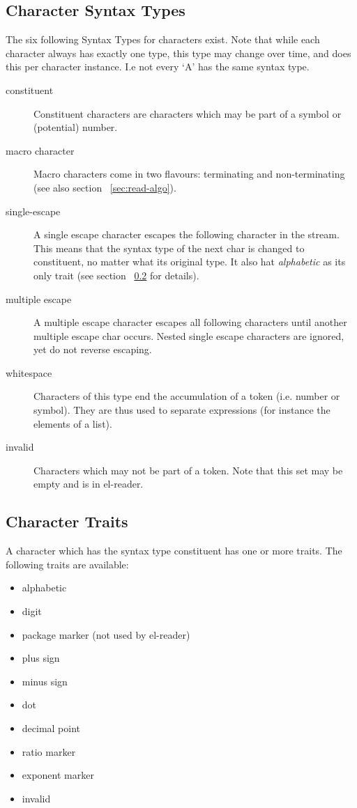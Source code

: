 \documentclass[a4paper,10pt,twoside]{report}
\newcommand{\elr}{el-reader}
\begin{document}
\subsection{Character Syntax Types}
\label{subsubsec:syntax-type}

The six following Syntax Types for characters exist.  Note that while each
character always has exactly one type, this type may change over time, and does
this per character instance.  I.e not every `A' has the same syntax type.

\begin{description}
\item[constituent] Constituent characters are characters which may be part of a
  symbol or (potential) number.
\item[macro character] Macro characters come in two flavours: terminating and
  non-terminating (see also section ~\ref{sec:read-algo}).
\item[single-escape] A single escape character escapes the following character
  in the stream.  This means that the syntax type of the next char is changed to
  constituent, no matter what its original type.  It also hat \emph{alphabetic}
  as its only trait (see section ~\ref{subsubsec:traits} for details).
\item[multiple escape] A multiple escape character escapes all following
  characters until another multiple escape char occurs.  Nested single escape
  characters are ignored, yet do not reverse escaping.
\item[whitespace] Characters of this type end the accumulation of a token
  (i.e. number or symbol).  They are thus used to separate expressions (for
  instance the elements of a list).
\item[invalid] Characters which may not be part of a token.  Note that this set
  may be empty and is in \elr{}.
\end{description}

\subsection{Character Traits}
\label{subsubsec:traits}

A character which has the syntax type constituent has one or more traits.
The following traits are available:

\begin{itemize}
\item alphabetic
\item digit
\item package marker (not used by \elr{})
\item plus sign
\item minus sign
\item dot
\item decimal point
\item ratio marker
\item exponent marker
\item invalid
\end{itemize}
\end{document}
